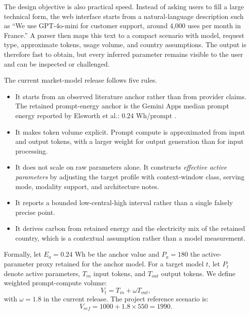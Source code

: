\documentclass[10pt,a4paper]{article}
\begin{document}
The design objective is also practical speed. Instead of asking users to fill a large technical form, the web interface starts from a natural-language description such as ``We use GPT-4o-mini for customer support, around 4{,}000 uses per month in France.'' A parser then maps this text to a compact scenario with model, request type, approximate tokens, usage volume, and country assumptions. The output is therefore fast to obtain, but every inferred parameter remains visible to the user and can be inspected or challenged.

The current market-model release follows five rules.
\begin{itemize}
\item It starts from an observed literature anchor rather than from provider claims. The retained prompt-energy anchor is the Gemini Apps median prompt energy reported by Elsworth et al.: $0.24$ Wh/prompt \cite{elsworth2025}.
\item It makes token volume explicit. Prompt compute is approximated from input and output tokens, with a larger weight for output generation than for input processing.
\item It does not scale on raw parameters alone. It constructs \emph{effective active parameters} by adjusting the target profile with context-window class, serving mode, modality support, and architecture notes.
\item It reports a bounded low-central-high interval rather than a single falsely precise point.
\item It derives carbon from retained energy and the electricity mix of the retained country, which is a contextual assumption rather than a model measurement.
\end{itemize}

Formally, let $E_a = 0.24$ Wh be the anchor value and $P_a = 180$ the active-parameter proxy retained for the anchor model. For a target model $t$, let $P_t$ denote active parameters, $T_{in}$ input tokens, and $T_{out}$ output tokens. We define weighted prompt-compute volume:
\begin{equation}
V_t = T_{in} + \omega T_{out},
\end{equation}
with $\omega = 1.8$ in the current release. The project reference scenario is:
\begin{equation}
V_{ref} = 1000 + 1.8 \times 550 = 1990.
\end{equation}
\end{document}
